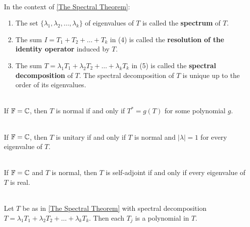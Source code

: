 \begin{definition}
	\hfill\\
	In the context of \autoref{The Spectral Theorem}:

	\begin{enumerate}
		\item The set $\{\lambda_1, \lambda_2, \dots, \lambda_k\}$ of eigenvalues of $T$ is called the \textbf{spectrum} of $T$.
		\item The sum $I = T_1 + T_2 + \dots + T_k$ in (4) is called the \textbf{resolution of the identity operator} induced by $T$.
		\item The sum $T = \lambda_1T_1 + \lambda_2T_2 + \dots + \lambda_kT_k$ in (5) is called the \textbf{spectral decomposition} of $T$. The spectral decomposition of $T$ is unique up to the order of its eigenvalues.
	\end{enumerate}
\end{definition}

\begin{corollary}
	\hfill\\
	If $\mathbb{F} = \mathbb{C}$, then $T$ is normal if and only if $T^* = g(T)$ for some polynomial $g$.
\end{corollary}

\begin{corollary}
	\hfill\\
	If $\mathbb{F} = \mathbb{C}$, then $T$ is unitary if and only if $T$ is normal and $|\lambda| = 1$ for every eigenvalue of $T$.
\end{corollary}

\begin{corollary}
	\hfill\\
	If $\mathbb{F} = \mathbb{C}$ and $T$ is normal, then $T$ is self-adjoint if and only if every eigenvalue of $T$ is real.
\end{corollary}

\begin{corollary}
	\hfill\\
	Let $T$ be as in \autoref{The Spectral Theorem} with spectral decomposition $T = \lambda_1T_1 + \lambda_2T_2 + \dots + \lambda_kT_k$. Then each $T_j$ is a polynomial in $T$.
\end{corollary}
